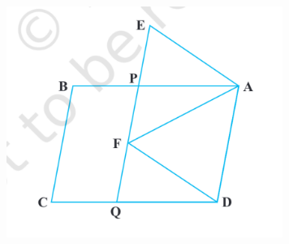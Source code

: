 \documentclass[12pt]{article}
\begin{document}
\begin{enumerate}
\begin{figure}[h]
	\centering
	\includegraphics[width=9cm]{Figs/Fig9.27.png}
	\caption{}
	\label{fig:9.27}
\end{figure}
\end{enumerate}
\end{document}
